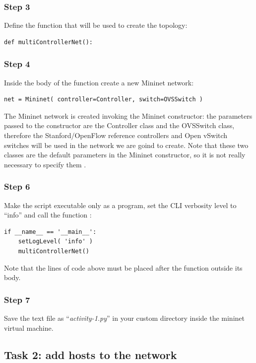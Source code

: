 \subsubsection*{Step 3}
Define the function that will be used to create the topology:
\begin{lstlisting}
def multiControllerNet():
\end{lstlisting}

\subsubsection*{Step 4}
Inside the body of the function  create a new Mininet
network:
\begin{lstlisting}
net = Mininet( controller=Controller, switch=OVSSwitch )
\end{lstlisting}

The Mininet network is created invoking the Mininet constructor: the parameters
passed to the constructor are the Controller class and the OVSSwitch class, therefore
the Stanford/OpenFlow reference controllers and Open vSwitch switches will be used
in the network we are goind to create. Note that these two classes are
the default parameters in the Mininet constructor, so it is not really necessary
to specify them \cite{ref-4}.

\subsubsection*{Step 6}
Make the script executable only as a program, set the CLI verbosity level to ``info''
and call the function :
\begin{lstlisting}
if __name__ == '__main__':
    setLogLevel( 'info' )
    multiControllerNet()
\end{lstlisting}
Note that the lines of code above must be placed after the function 
outside its body.

\subsubsection*{Step 7}
Save the text file as ``\emph{activity-1.py}'' in your custom directory inside
the mininet virtual machine.





\subsection*{Task 2: add hosts to the network}
